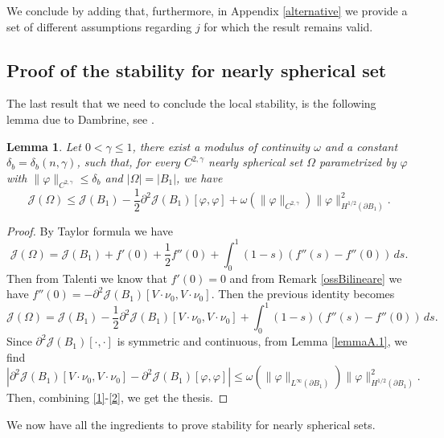 \documentclass[oneside,a4paper,11pt,notitlepage]{article}
\newcommand{\abs}[1]{{\left|#1\right|}}
\theoremstyle{definition}
\theoremstyle{plain}
\newtheorem{lemma}[theorem]{Lemma}
\theoremstyle{definition}
\begin{document}
We conclude by adding that, furthermore, in Appendix \ref{alternative} we provide a set of different assumptions regarding $j$ for which the result remains valid.
\subsection{Proof of the stability for nearly spherical set}
The last result that we need to conclude the local stability, is the following lemma due to Dambrine, see \cite[Theorem 1]{D}.
\begin{lemma}\label{lemma 3.4}
    Let $0<\gamma\leq1$, there exist a modulus of continuity $\omega$ and a constant $\delta_b=\delta_b(n,\gamma)$, such that, for every $C^{2,\gamma}$ nearly spherical set $\Omega$ parametrized by $\varphi$ with $\|\varphi\|_{C^{2,\gamma}}\leq\delta_b$ and $\abs{\Omega}=\abs{B_1}$, we have
    \begin{equation*}
        \mathcal{J}(\Omega)\leq\mathcal{J}(B_1)-\frac{1}{2}\partial^2\mathcal{J}(B_1)[\varphi,\varphi]+\omega(\|\varphi\|_{C^{2,\gamma}})\|\varphi\|_{H^{1/2}(\partial B_1)}^2.
    \end{equation*}
\end{lemma}
\begin{proof}
    By Taylor formula we have 
    \begin{equation*}
        \mathcal{J}(\Omega)=\mathcal{J}(B_1)+f'(0)+\frac{1}{2}f''(0)+\int_0^1(1-s)(f''(s)-f''(0))\,ds.
    \end{equation*}
    Then from Talenti we know that $f'(0)=0$ and from Remark \ref{ossBilineare} we have $f''(0)=-\partial^2\mathcal{J}(B_1)[V\cdot\nu_0,V\cdot\nu_0]$. Then the previous identity becomes
    \begin{equation}\label{1}
        \mathcal{J}(\Omega)=\mathcal{J}(B_1)-\frac{1}{2}\partial^2\mathcal{J}(B_1)[V\cdot\nu_0,V\cdot\nu_0]+\int_0^1(1-s)(f''(s)-f''(0))\,ds.
    \end{equation}
    Since $\partial^2\mathcal{J}(B_1)[\cdot,\cdot]$ is symmetric and continuous, from Lemma \ref{lemmaA.1}, we find
    \begin{equation}\label{2}
        \abs{\partial^2\mathcal{J}(B_1)[V\cdot\nu_0,V\cdot\nu_0]-\partial^2\mathcal{J}(B_1)[\varphi,\varphi]}\leq\omega(\|\varphi\|_{L^\infty(\partial B_1)})\|\varphi\|_{H^{1/2}(\partial B_1)}^2.
    \end{equation}
    Then, combining \eqref{1}-\eqref{2}, we get the thesis.
\end{proof}
We now have all the ingredients to prove stability for nearly spherical sets.
\end{document}
